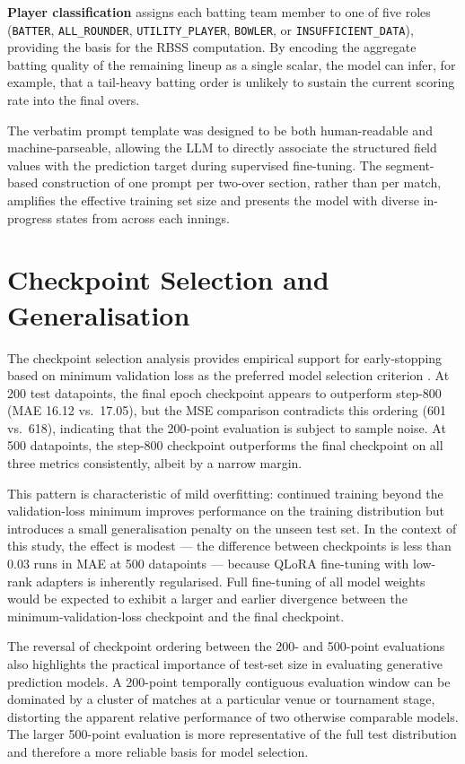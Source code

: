 \textbf{Player classification} assigns each batting team member to one of five roles (\texttt{BATTER}, \texttt{ALL\_ROUNDER}, \texttt{UTILITY\_PLAYER}, \texttt{BOWLER}, or \texttt{INSUFFICIENT\_DATA}), providing the basis for the RBSS computation. By encoding the aggregate batting quality of the remaining lineup as a single scalar, the model can infer, for example, that a tail-heavy batting order is unlikely to sustain the current scoring rate into the final overs.

The verbatim prompt template was designed to be both human-readable and machine-parseable, allowing the LLM to directly associate the structured field values with the prediction target during supervised fine-tuning. The segment-based construction of one prompt per two-over section, rather than per match, amplifies the effective training set size and presents the model with diverse in-progress states from across each innings.

\section{Checkpoint Selection and Generalisation}

The checkpoint selection analysis provides empirical support for early-stopping based on minimum validation loss as the preferred model selection criterion \cite{prechelt1998early}. At 200 test datapoints, the final epoch checkpoint appears to outperform step-800 (MAE 16.12 vs.\ 17.05), but the MSE comparison contradicts this ordering (601 vs.\ 618), indicating that the 200-point evaluation is subject to sample noise. At 500 datapoints, the step-800 checkpoint outperforms the final checkpoint on all three metrics consistently, albeit by a narrow margin.

This pattern is characteristic of mild overfitting: continued training beyond the validation-loss minimum improves performance on the training distribution but introduces a small generalisation penalty on the unseen test set. In the context of this study, the effect is modest --- the difference between checkpoints is less than 0.03 runs in MAE at 500 datapoints --- because QLoRA fine-tuning with low-rank adapters is inherently regularised. Full fine-tuning of all model weights would be expected to exhibit a larger and earlier divergence between the minimum-validation-loss checkpoint and the final checkpoint.

The reversal of checkpoint ordering between the 200- and 500-point evaluations also highlights the practical importance of test-set size in evaluating generative prediction models. A 200-point temporally contiguous evaluation window can be dominated by a cluster of matches at a particular venue or tournament stage, distorting the apparent relative performance of two otherwise comparable models. The larger 500-point evaluation is more representative of the full test distribution and therefore a more reliable basis for model selection.

